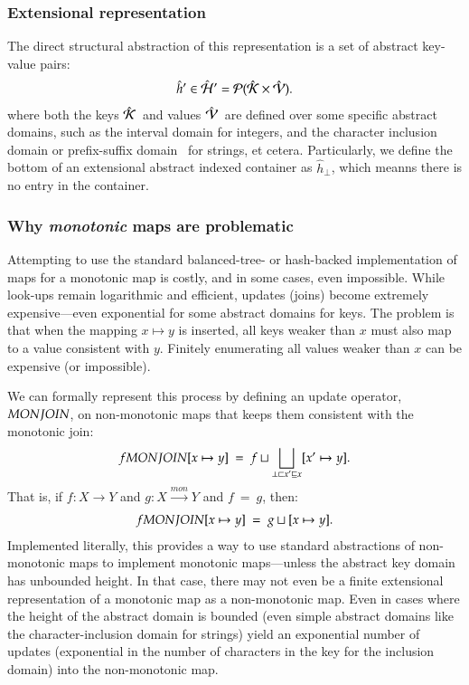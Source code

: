 \documentclass[preprint,9pt]{sigplanconf} %
\begin{document}
\subsubsection{Extensional representation}
The direct structural abstraction of this representation is a set of
abstract key-value pairs:
\begin{align*}
\hat h' \in \hat {\mathcal{H}} ' = \mathcal{P} (\hat{\mathcal{K}} \times \hat{\mathcal{V}}).
\end{align*}
where both the keys $\hat{\mathcal{K}}$\ and values $\hat{\mathcal{V}}$\  are defined over some
specific abstract domains, such as the interval domain for integers,
and the character inclusion domain or prefix-suffix
domain~\cite{costantini2011static} for strings, et
cetera. Particularly, we define the bottom of an extensional abstract
indexed container as $\hat h_\perp$, which meanns there is no entry in
the container.

\subsubsection{Why \emph{monotonic} maps are problematic}
Attempting to use the standard balanced-tree- or hash-backed
implementation of maps for a monotonic map is costly, and in some
cases, even impossible. While look-ups remain logarithmic and
efficient, updates (joins) become extremely expensive—even exponential
for some abstract domains for keys. The problem is that when the
mapping $x \mapsto y$ is inserted, all keys weaker than $x$ must also
map to a value consistent with $y$. Finitely enumerating all values
weaker than $x$ can be expensive (or impossible).

We can formally represent this process by defining an update operator,
$MONJOIN$, on non-monotonic maps that keeps them consistent with
the monotonic join:
\begin{align*}
f MONJOIN [x \mapsto y]\ =\ f \sqcup \bigsqcup_{\substack{\perp
    \sqsubset x' \sqsubseteq x}} [x' \mapsto y].
\end{align*}
That is, if $f:X \rightarrow Y$ and $g:X \xrightarrow{mon} Y$ and
$f\ =\ g$, then:
\begin{align*}
f MONJOIN [x \mapsto y]\ =\ g \sqcup [x \mapsto y].
\end{align*}
Implemented literally, this provides a way to use standard
abstractions of non-monotonic maps to implement monotonic
maps---unless the abstract key domain has unbounded height. In that
case, there may not even be a finite extensional representation of a
monotonic map as a non-monotonic map. Even in cases where the height
of the abstract domain is bounded (even simple abstract domains like
the character-inclusion domain for strings) yield an exponential
number of updates (exponential in the number of characters in the key
for the inclusion domain) into the non-monotonic map.
\end{document}
